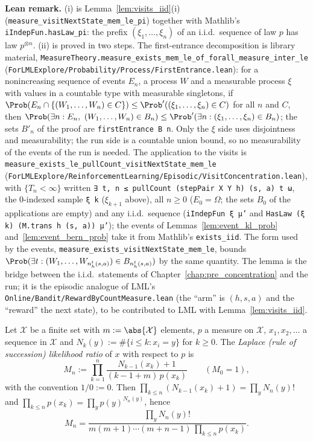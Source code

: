 \textbf{Lean remark.} (i) is Lemma~\ref{lem:visits_iid}(i) (\texttt{measure\_visitNextState\_mem\_le\_pi})
together with Mathlib's \texttt{iIndepFun.hasLaw\_pi}: the prefix $(\xi_1, \dots, \xi_n)$ of an
i.i.d.\ sequence of law $p$ has law $p^{\otimes n}$. (ii) is proved in two steps. The
first-entrance decomposition is library material,
\texttt{MeasureTheory.measure\_exists\_mem\_le\_of\_forall\_measure\_inter\_le}
(\texttt{ForLMLExplore/Probability/Process/FirstEntrance.lean}): for a nonincreasing sequence of events
$E_n$, a process $W$ and a measurable process $\xi$ with values in a countable type with
measurable singletons, if $\Prob(E_n \cap \{(W_1, \dots, W_n) \in C\}) \le \Prob'((\xi_1, \dots, \xi_n) \in C)$
for all $n$ and $C$, then $\Prob(\exists n : E_n,\ (W_1, \dots, W_n) \in B_n) \le \Prob'(\exists n : (\xi_1, \dots, \xi_n) \in B_n)$;
the sets $B'_n$ of the proof are \texttt{firstEntrance B n}. Only the $\xi$ side uses disjointness
and measurability; the run side is a countable union bound, so no measurability of the events of
the run is needed. The application to the visits is
\texttt{measure\_exists\_le\_pullCount\_visitNextState\_mem\_le} (\texttt{ForLMLExplore/ReinforcementLearning/Episodic/VisitConcentration.lean}),
with $\{T_n < \infty\}$ written \texttt{∃ t, n ≤ pullCount (stepPair X Y h) (s, a) t ω}, the
$0$-indexed sample \texttt{ξ k} ($\xi_{k+1}$ above), all $n \ge 0$ ($E_0 = \Omega$; the sets $B_0$
of the applications are empty) and any i.i.d.\ sequence (\texttt{iIndepFun ξ μ'} and
\texttt{HasLaw (ξ k) (M.trans h (s, a)) μ'}); the events of Lemmas~\ref{lem:event_kl_prob}
and~\ref{lem:event_bern_prob} take it from Mathlib's \texttt{exists\_iid}. The form used by the
events, \texttt{measure\_exists\_visitNextState\_mem\_le}, bounds
$\Prob(\exists t : (W_1, \dots, W_{n^t_h(s, a)}) \in B_{n^t_h(s, a)})$ by the same quantity. The
lemma is the bridge between the i.i.d.\ statements of Chapter~\ref{chap:pre_concentration} and the
run; it is the episodic analogue of LML's \texttt{Online/Bandit/RewardByCountMeasure.lean} (the
``arm'' is $(h, s, a)$ and the ``reward'' the next state), to be contributed to LML with
Lemma~\ref{lem:visits_iid}.

\begin{lemma}\label{lem:emp_laplace_product}
\leanok
Let $\mathcal X$ be a finite set with $m := \abs{\mathcal X}$ elements, $p$ a measure on
$\mathcal X$, $x_1, x_2, \dots$ a sequence in $\mathcal X$ and $N_k(y) := \#\{i \le k : x_i = y\}$
for $k \ge 0$. The \emph{Laplace (rule of succession) likelihood ratio} of $x$ with respect to $p$
is
\[
  M_n := \prod_{k = 1}^{n} \frac{N_{k-1}(x_k) + 1}{(k - 1 + m)\, p(x_k)} \qquad (M_0 = 1),
\]
with the convention $1/0 := 0$. Then $\prod_{k \le n} (N_{k-1}(x_k) + 1) = \prod_{y} N_n(y)!$ and
$\prod_{k \le n} p(x_k) = \prod_y p(y)^{N_n(y)}$, hence
\[
  M_n = \frac{\prod_y N_n(y)!}{m (m + 1) \cdots (m + n - 1)\, \prod_{k \le n} p(x_k)} .
\]
\end{lemma}

